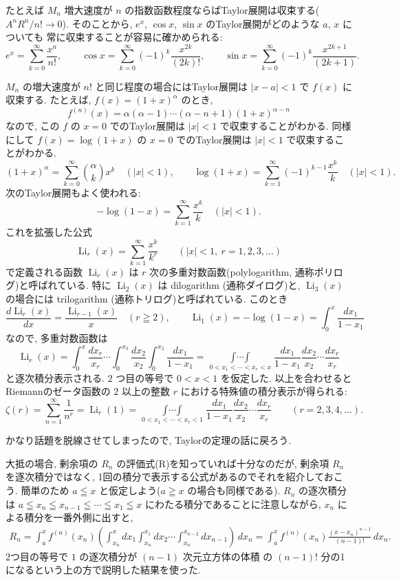 \documentclass[12pt,twoside]{jarticle}
\newcommand\Li{\operatorname{Li}}
\theoremstyle{jplain}
\theoremstyle{jplain}
\theoremstyle{jplain}
\numberwithin{theorem}{section}
\numberwithin{equation}{section}
\numberwithin{figure}{section}
\numberwithin{table}{section}
\begin{document}
たとえば $M_n$ 増大速度が $n$ の指数函数程度ならばTaylor展開は収束する($A^nR^n/n!\to 0$).
そのことから, $e^x$, $\cos x$, $\sin x$ のTaylor展開がどのような $a$, $x$ についても
常に収束することが容易に確かめられる:
\[
e^x = \sum_{k=0}^\infty \frac{x^n}{n!}, \qquad
\cos x = \sum_{k=0}^\infty (-1)^k \frac{x^{2k}}{(2k)!}, \qquad
\sin x = \sum_{k=0}^\infty (-1)^k \frac{x^{2k+1}}{(2k+1)}.
\]

$M_n$ の増大速度が $n!$ と同じ程度の場合にはTaylor展開は $|x-a|<1$ で $f(x)$ に収束する.
たとえば, $f(x)=(1+x)^\alpha$ のとき,
\[
f^{(n)}(x)=\alpha(\alpha-1)\cdots(\alpha-n+1)(1+x)^{\alpha-n}
\]
なので, この $f$ の $x=0$ でのTaylor展開は $|x|<1$ で収束することがわかる.
同様にして $f(x)=\log(1+x)$ の $x=0$ でのTaylor展開は $|x|<1$ で収束することがわかる.
\[
(1+x)^\alpha = \sum_{k=0}^\infty\binom{\alpha}{k}x^k \quad (|x|<1), \qquad
\log(1+x) = \sum_{k=1}^\infty(-1)^{k-1}\frac{x^k}{k} \quad (|x|<1).
\]
次のTaylor展開もよく使われる:
\[
-\log(1-x) = \sum_{k=1}^\infty \frac{x^k}{k} \quad (|x|<1).
\]
これを拡張した公式
\[
\Li_r(x)=\sum_{k=1}^\infty\frac{x^k}{k^r} \qquad (|x|<1,\ r=1,2,3,\ldots)
\]
で定義される函数 $\Li_r(x)$ は
$r$ 次の多重対数函数(polylogarithm, 通称ポリログ)と呼ばれている.
特に $\Li_2(x)$ は dilogarithm (通称ダイログ)と,
$\Li_3(x)$ の場合には trilogarithm (通称トリログ)と呼ばれている.
このとき
\[
\frac{d\Li_r(x)}{dx}=\frac{\Li_{r-1}(x)}{x} \quad (r\geqq 2), \qquad
\Li_1(x)=-\log(1-x)=\int_0^x \frac{dx_1}{1-x_1}
\]
なので, 多重対数函数は
\[
\operatorname{Li}_r(x)
=\int_0^x\frac{dx_r}{x_r}\cdots\int_0^{x_3}\frac{dx_2}{x_2}
\int_0^{x_2}\frac{dx_1}{1-x_1}
=\mathop{\int\cdots\int}\limits_{0<x_1<\cdots<x_r<x}
\frac{dx_1}{1-x_1}\frac{dx_2}{x_2}\cdots\frac{dx_r}{x_r}
\]
と逐次積分表示される.
$2$ つ目の等号で $0<x<1$ を仮定した.
以上を合わせるとRiemannのゼータ函数の
$2$ 以上の整数 $r$ における特殊値の積分表示が得られる:
\[
\zeta(r)
=\sum_{n=1}^\infty\frac{1}{n^r}
=\Li_r(1)
=\mathop{\int\cdots\int}\limits_{0<x_1<\cdots<x_r<1}
\frac{dx_1}{1-x_1}\frac{dx_2}{x_2}\cdots\frac{dx_r}{x_r}
\qquad (r=2,3,4,\ldots).
\]

かなり話題を脱線させてしまったので, Taylorの定理の話に戻ろう.

大抵の場合, 剰余項の $R_n$ の評価式(R)を知っていれば十分なのだが,
剰余項 $R_n$ を逐次積分ではなく,
1回の積分で表示する公式があるのでそれを紹介しておこう.
簡単のため $a\leqq x$ と仮定しよう($a\geqq x$ の場合も同様である).
$R_n$ の逐次積分は $a\leqq x_n\leqq x_{n-1}\leqq\cdots\leqq x_1\leqq x$
にわたる積分であることに注意しながら, $x_n$ による積分を一番外側に出すと,
\begin{align*}
R_n
= \int_a^x f^{(n)}(x_n)\left(\int_{x_n}^x\!\!\!dx_1\int_{x_n}^{x_1}\!\!\!dx_2\cdots\int_{x_n}^{x_{n-2}}\!\!\!dx_{n-1}\right)\,dx_n
= \int_a^x f^{(n)}(x_n)\frac{(x-x_n)^{n-1}}{(n-1)!}\,dx_n.
\end{align*}
2つ目の等号で $1$ の逐次積分が $(n-1)$ 次元立方体の体積
の $(n-1)!$ 分の1になるという上の方で説明した結果を使った.
\end{document}

